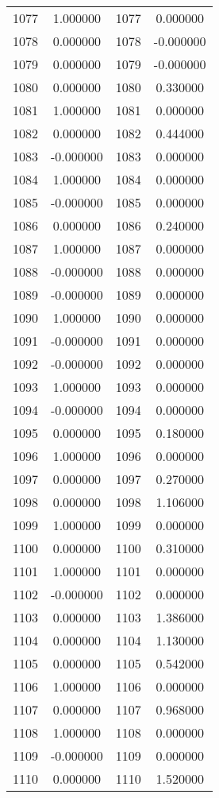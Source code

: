 \documentclass[12pt]{article}
\begin{document}
\begin{longtable}{@{}cccc@{}}
1077 & 1.000000 & 1077 & 0.000000 \\
1078 & 0.000000 & 1078 & -0.000000 \\
1079 & 0.000000 & 1079 & -0.000000 \\
1080 & 0.000000 & 1080 & 0.330000 \\
1081 & 1.000000 & 1081 & 0.000000 \\
1082 & 0.000000 & 1082 & 0.444000 \\
1083 & -0.000000 & 1083 & 0.000000 \\
1084 & 1.000000 & 1084 & 0.000000 \\
1085 & -0.000000 & 1085 & 0.000000 \\
1086 & 0.000000 & 1086 & 0.240000 \\
1087 & 1.000000 & 1087 & 0.000000 \\
1088 & -0.000000 & 1088 & 0.000000 \\
1089 & -0.000000 & 1089 & 0.000000 \\
1090 & 1.000000 & 1090 & 0.000000 \\
1091 & -0.000000 & 1091 & 0.000000 \\
1092 & -0.000000 & 1092 & 0.000000 \\
1093 & 1.000000 & 1093 & 0.000000 \\
1094 & -0.000000 & 1094 & 0.000000 \\
1095 & 0.000000 & 1095 & 0.180000 \\
1096 & 1.000000 & 1096 & 0.000000 \\
1097 & 0.000000 & 1097 & 0.270000 \\
1098 & 0.000000 & 1098 & 1.106000 \\
1099 & 1.000000 & 1099 & 0.000000 \\
1100 & 0.000000 & 1100 & 0.310000 \\
1101 & 1.000000 & 1101 & 0.000000 \\
1102 & -0.000000 & 1102 & 0.000000 \\
1103 & 0.000000 & 1103 & 1.386000 \\
1104 & 0.000000 & 1104 & 1.130000 \\
1105 & 0.000000 & 1105 & 0.542000 \\
1106 & 1.000000 & 1106 & 0.000000 \\
1107 & 0.000000 & 1107 & 0.968000 \\
1108 & 1.000000 & 1108 & 0.000000 \\
1109 & -0.000000 & 1109 & 0.000000 \\
1110 & 0.000000 & 1110 & 1.520000 \\

\end{longtable}
\end{document}
